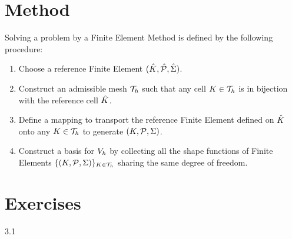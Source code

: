
\section{Method}

\begin{lgrthm}\label{alg:fem}

Solving a problem by a Finite Element Method is defined by the following procedure:
\begin{enumerate}
\item Choose a reference Finite Element ${({\hat {{K}}},{\hat {{\mathcal P}}}, {\hat{{\Sigma}}})}$.
\item Construct an admissible mesh ${\mathcal T}_h$ such that any cell ${K} \in {\mathcal T}_h$ is in bijection with the reference cell ${\hat {{K}}}$.
\item Define a mapping to transport the reference Finite Element defined on ${\hat {{K}}}$ onto any ${K} \in {\mathcal T}_h$ to generate ${({K},{\mathcal P}, {\Sigma})}$.
\item Construct a basis for ${{V}}_h$ by collecting all the shape functions of Finite Elements $\lbrace {({K},{\mathcal P}, {\Sigma})} \rbrace_{{K} \in {\mathcal T}_h}$ sharing the same degree of freedom.

\end{enumerate}
\end{lgrthm}

\newpage

\section{Exercises}

\begin{tmaxrcs}{}{3.1}
\end{tmaxrcs}

